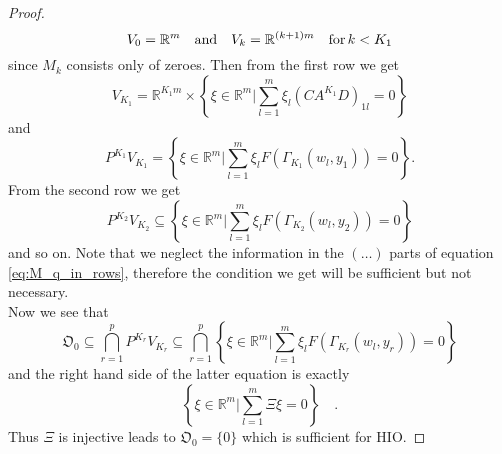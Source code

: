 \begin{proof}
\begin{equation}
	V_0 = \mathbb{R}^m \quad \text{and} \quad V_k = \mathbb{R}^{(k+1)m} \quad \text{for}\, k<K_1
	\end{equation}
	since $M_k$ consists only of zeroes. Then from the first row we get
	\begin{equation}
	V_{K_1} = \mathbb{R}^{K_1m} \times \left\{\xi\in \mathbb{R}^m \big| \sum\limits_{l=1}^m 
	\xi_l (CA^{K_1}D)_{1l} = 0 \right\}
	\end{equation}
	and 
	\begin{equation}
	P^{K_1} V_{K_1} = \left\{\xi\in \mathbb{R}^m \big| \sum\limits_{l=1}^m 
	\xi_l F\left(\Gamma_{K_1}(w_l,y_1)\right) = 0 \right\} .
	\end{equation}
	From the second row we get 
	\begin{equation}
	P^{K_2}V_{K_2} \subseteq \left\{\xi\in \mathbb{R}^m \big| \sum
	\limits_{l=1}^m \xi_l F\left( \Gamma_{K_2}(w_l,y_2) \right) = 0 \right\}
	\end{equation}
	and so on. Note that we neglect the information in the $(\hdots)$ parts of equation 
	\eqref{eq:M_q_in_rows}, therefore the condition we get will be sufficient but not 
	necessary.\\
	
	Now we see that 
	\begin{equation}
	\mathfrak{O}_0 \subseteq  \bigcap\limits_{r=1}^p P^{K_r}V_{K_r} \subseteq \bigcap_{r=1}^p 
	\left\{\xi\in \mathbb{R}^m \big| \sum\limits_{l=1}^m 
	\xi_l F\left( \Gamma_{K_r} (w_l,y_r) \right) = 0 \right\}
	\end{equation}
	and the right hand side of the latter equation is exactly
	\begin{equation}
	\left\{\xi\in \mathbb{R}^m \big| \sum\limits_{l=1}^m 
	\Xi \xi = 0 \right\} \quad .
	\end{equation}
	Thus $\Xi$ is injective leads to $\mathfrak{O}_0=\{0\}$ which is sufficient for HIO.
\end{proof}
